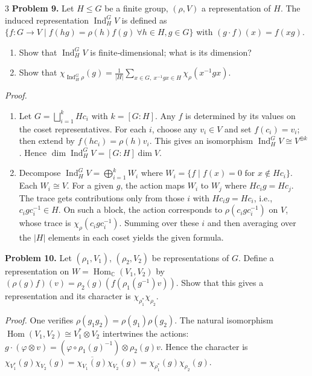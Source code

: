 \documentclass[10pt,landscape]{article}
\begin{document}
\begin{multicols}{3}
\noindent\textbf{Problem 9.} Let \(H\le G\) be a finite group, \((\rho,V)\) a representation of \(H\). The induced representation \(\operatorname{Ind}_H^G V\) is defined as \(\{f:G\to V\mid f(hg)=\rho(h)f(g)\ \forall h\in H,g\in G\}\) with \((g\cdot f)(x)=f(xg)\).

\begin{enumerate}
\item Show that \(\operatorname{Ind}_H^G V\) is finite‑dimensional; what is its dimension?
\item Show that \(\chi_{\operatorname{Ind}_H^G\rho}(g)=\frac1{|H|}\sum_{x\in G,\ x^{-1}gx\in H}\chi_\rho(x^{-1}gx)\).
\end{enumerate}

\textit{Proof.}
\begin{enumerate}
\item Let \(G=\bigsqcup_{i=1}^k Hc_i\) with \(k=[G:H]\). Any \(f\) is determined by its values on the coset representatives. For each \(i\), choose any \(v_i\in V\) and set \(f(c_i)=v_i\); then extend by \(f(hc_i)=\rho(h)v_i\). This gives an isomorphism \(\operatorname{Ind}_H^G V\cong V^{\oplus k}\). Hence \(\dim\operatorname{Ind}_H^G V=[G:H]\dim V\).
\item Decompose \(\operatorname{Ind}_H^G V=\bigoplus_{i=1}^k W_i\) where \(W_i=\{f\mid f(x)=0\text{ for }x\notin Hc_i\}\). Each \(W_i\cong V\). For a given \(g\), the action maps \(W_i\) to \(W_j\) where \(Hc_i g=Hc_j\). The trace gets contributions only from those \(i\) with \(Hc_i g=Hc_i\), i.e., \(c_i g c_i^{-1}\in H\). On such a block, the action corresponds to \(\rho(c_i g c_i^{-1})\) on \(V\), whose trace is \(\chi_\rho(c_i g c_i^{-1})\). Summing over these \(i\) and then averaging over the \(|H|\) elements in each coset yields the given formula.
\end{enumerate}

\noindent\textbf{Problem 10.} Let \((\rho_1,V_1)\), \((\rho_2,V_2)\) be representations of \(G\). Define a representation on \(W=\operatorname{Hom}_{\mathbb{C}}(V_1,V_2)\) by \((\rho(g)f)(v)=\rho_2(g)(f(\rho_1(g^{-1})v))\). Show that this gives a representation and its character is \(\chi_{\rho_1^*}\chi_{\rho_2}\).

\textit{Proof.} One verifies \(\rho(g_1g_2)=\rho(g_1)\rho(g_2)\). The natural isomorphism \(\operatorname{Hom}(V_1,V_2)\cong V_1^*\otimes V_2\) intertwines the actions: \(g\cdot(\varphi\otimes v)=(\varphi\circ\rho_1(g)^{-1})\otimes\rho_2(g)v\). Hence the character is \(\chi_{V_1^*}(g)\chi_{V_2}(g)=\overline{\chi_{V_1}(g)}\chi_{V_2}(g)=\chi_{\rho_1^*}(g)\chi_{\rho_2}(g)\).


\end{multicols}
\end{document}
